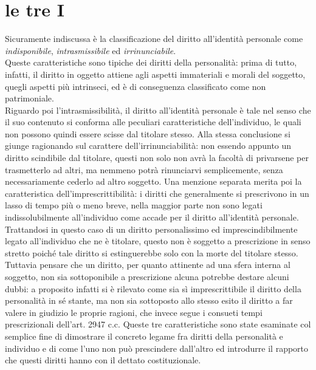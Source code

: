 \section{le tre I}
Sicuramente indiscussa è la classificazione del diritto all'identità personale come \textit{indisponibile}, \textit{intrasmissibile} ed \textit{irrinunciabile}. 
\\Queste caratteristiche sono tipiche dei diritti della personalità: prima di tutto, infatti, il diritto in oggetto attiene agli aspetti immateriali e morali del soggetto, quegli aspetti più intrinseci, ed è di conseguenza classificato come non patrimoniale. 
\\Riguardo poi l'intrasmissibilità, il diritto all'identità personale è tale nel senso che il suo contenuto si conforma alle peculiari caratteristiche dell'individuo, le quali non possono quindi essere scisse dal titolare stesso. Alla stessa conclusione si giunge ragionando sul carattere dell'irrinunciabilità: non essendo appunto un diritto scindibile dal titolare, questi non solo non avrà la facoltà di privarsene per trasmetterlo ad altri, ma nemmeno potrà rinunciarvi semplicemente, senza necessariamente cederlo ad altro soggetto.
Una menzione separata merita poi la caratteristica dell'imprescrittibilità: i diritti che generalmente si prescrivono in un lasso di tempo più o meno breve, nella maggior parte non sono legati indissolubilmente all'individuo come accade per il diritto all'identità personale. Trattandosi in questo caso di un diritto personalissimo ed imprescindibilmente legato all'individuo che ne è titolare, questo non è soggetto a prescrizione in senso stretto poiché tale diritto si estinguerebbe solo con la morte del titolare stesso. \\Tuttavia pensare che un diritto, per quanto attinente ad una sfera interna al soggetto, non sia sottoponibile a prescrizione alcuna potrebbe destare alcuni dubbi: a proposito infatti si è rilevato come sia sì imprescrittibile il diritto della personalità in sé stante, ma non sia sottoposto allo stesso esito il diritto a far valere in giudizio le proprie ragioni, che invece segue i consueti tempi prescrizionali dell'art. 2947 c.c.
Queste tre caratteristiche sono state esaminate col semplice fine di dimostrare il concreto legame fra diritti della personalità e individuo e di come l'uno non può prescindere dall'altro ed introdurre il rapporto che questi diritti hanno con il dettato costituzionale.


